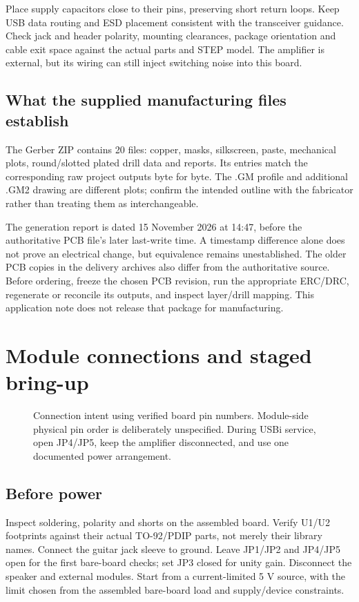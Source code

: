 \documentclass[a4paper,10pt]{article}
\newcommand{\nextsection}[1]{\clearpage\section{#1}}
\begin{document}
Place supply capacitors close to their pins, preserving short return loops. Keep USB data routing and ESD placement consistent with the transceiver guidance. Check jack and header polarity, mounting clearances, package orientation and cable exit space against the actual parts and STEP model. The amplifier is external, but its wiring can still inject switching noise into this board.

\subsection{What the supplied manufacturing files establish}
The Gerber ZIP contains 20 files: copper, masks, silkscreen, paste, mechanical plots, round/slotted plated drill data and reports. Its entries match the corresponding raw project outputs byte for byte. The .GM profile and additional .GM2 drawing are different plots; confirm the intended outline with the fabricator rather than treating them as interchangeable.

The generation report is dated 15 November 2026 at 14:47, before the authoritative PCB file's later last-write time. A timestamp difference alone does not prove an electrical change, but equivalence remains unestablished. The older PCB copies in the delivery archives also differ from the authoritative source. Before ordering, freeze the chosen PCB revision, run the appropriate ERC/DRC, regenerate or reconcile its outputs, and inspect layer/drill mapping. This application note does not release that package for manufacturing.

\nextsection{Module connections and staged bring-up}
\label{sec:bringup}
\begin{figure}[H]\centering\MFXConnectionsDiagram
\caption{Connection intent using verified board pin numbers. Module-side physical pin order is deliberately unspecified. During USBi service, open JP4/JP5, keep the amplifier disconnected, and use one documented power arrangement.}\label{fig:connections}
\end{figure}

\subsection{Before power}
Inspect soldering, polarity and shorts on the assembled board. Verify U1/U2 footprints against their actual TO-92/PDIP parts, not merely their library names. Connect the guitar jack sleeve to ground. Leave JP1/JP2 and JP4/JP5 open for the first bare-board checks; set JP3 closed for unity gain. Disconnect the speaker and external modules. Start from a current-limited 5 V source, with the limit chosen from the assembled bare-board load and supply/device constraints.
\end{document}
